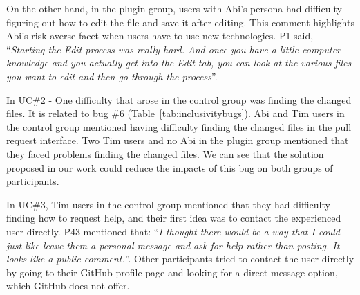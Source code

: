 { 
 On the other hand, in the plugin group, users with Abi's persona had difficulty figuring out how to edit the file and save it after editing. This comment highlights Abi's risk-averse facet when users have to use new technologies. P1 said, ``\textit{Starting the Edit process was really hard. And once you have a little computer knowledge and you actually get into the Edit tab, you can look at the various files you want to edit and then go through the process}''. 


In UC\#2 - One difficulty that arose in the control group was finding the changed files. It is related to bug \#6 (Table~\ref{tab:inclusivitybugs}). Abi and Tim users in the control group mentioned having difficulty finding the changed files in the pull request interface. Two Tim users and no Abi in the plugin group mentioned that they faced problems finding the changed files. We can see that the solution proposed in our work could reduce the impacts of this bug on both groups of participants. 



In UC\#3, Tim users in the control group mentioned that they had difficulty finding how to request help, and their first idea was to contact the experienced user directly. P43 mentioned that: ``\textit{I thought there would be a way that I could just like leave them a personal message and ask for help rather than posting. It looks like a public comment.}''. Other participants tried to contact the user directly by going to their GitHub profile page and looking for a direct message option, which GitHub does not offer. 


}
